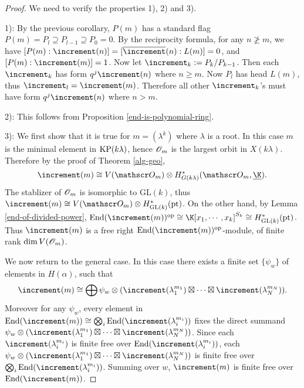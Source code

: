 \begin{proof}
    We need to verify the properties 1), 2) and 3).

    1): By the previous corollary, $P(m)$ has a standard flag
    $P(m) = P_l\supseteq P_{l-1}\supseteq P_0 = 0$. By the 
    reciprocity formula, for any $n\not\ge m$, we have 
    $[P(m):\std(n)] = [\pstd(n):L(m)] = 0$, and $[P(m):\std(m)] = 1$.
    Now let $\std_k := P_k/P_{k-1}$. Then each $\std_k$ has form
    $q^j\std(n)$ where $n\ge m$. Now $P_l$ has head $L(m)$,
    thus $\std_l = \std(m)$. Therefore all other $\std_k$'s
    must have form $q^j\std(n)$ where $n>m$.

    2): This follows from Proposition \ref{end-is-polynomial-ring}.

    3): We first show that it is true for $m = (\lambda^k)$ where
    $\lambda$ is a root. In this case $m$ is the minimal element
    in $\operatorname{KP}(k\lambda)$, hence $\mathscr{O}_m$ is the largest orbit in 
    $X(k\lambda)$. Therefore by the proof of Theorem \ref{alg-geo},
    \[
        \std(m)\cong V(\OO_m)\ox H^*_{G(k\lambda)}(\OO_m,\underline{\K}).
    \]
    The stablizer of $\mathscr{O}_m$ is isomorphic to $\mathrm{GL}(k)$,
    thus $\std(m)\cong V(\OO_m)\ox H^*_{\mathrm{GL}(k)}(\pt)$.
    On the other hand, by Lemma \ref{end-of-divided-power},
    $\End(\std(m))^{\mathrm{op}}\cong\K[x_1,\cdots,x_k]^{S_k}
    \cong H^*_{\mathrm{GL}(k)}(\pt)$. Thus $\std(m)$ is a 
    free right $\End(\std(m))^{\mathrm{op}}$-module,
    of finite rank $\dim V(\mathscr{O}_m)$.

    We now return to the general case. In this case there exists 
    a finite set $\{\psi_w\}$ of elements in $H(\alpha)$,
    such that 
    \[
        \std(m)\cong\bigoplus\psi_w\ox(\std(\lambda_1^{m_1})
        \ex\cdots\ex\std(\lambda_N^{m_N})).
    \] 
    Moreover for any $\psi_w$,
    every element in $\End(\std(m))\cong\bigotimes_i\End(\std(\lambda_i^{m_i}))$
    fixes the direct summand $\psi_w\ox(\std(\lambda_1^{m_1})\ex\cdots\ex\std(\lambda_N^{m_N}))$.
    Since each $\std(\lambda_i^{m_i})$ is finite free over 
    $\End(\std(\lambda_i^{m_i}))$, each 
    $\psi_w\ox(\std(\lambda_1^{m_1})\ex\cdots\ex\std(\lambda_N^{m_N}))$
    is finite free over $\bigotimes_i\End(\std(\lambda_i^{m_i}))$.
    Summing over $w$, $\std(m)$ is finite free over $\End(\std(m))$.
\end{proof}



